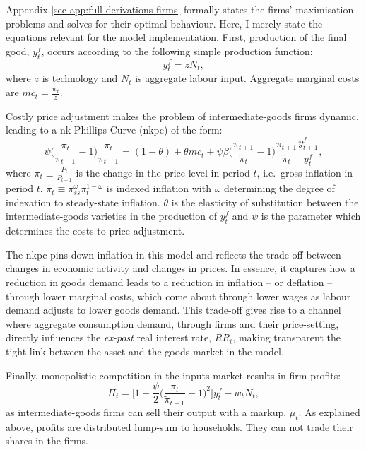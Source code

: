 \documentclass[a4paper,12pt]{article} %
\numberwithin{equation}{section} %
\numberwithin{figure}{section}
\numberwithin{table}{section}
\begin{document}
Appendix \ref{sec-app:full-derivations-firms} formally states the firms' maximisation problems and solves for their optimal behaviour. Here, I merely state the equations relevant for the model implementation. First, production of the final good, $y_t^f$, occurs according to the following simple production function:
\begin{equation}
    y_t^f = z N_t, \label{eq:firms-production}
\end{equation}
where $z$ is technology and $N_t$ is aggregate labour input. Aggregate marginal costs are $mc_t = \frac{w_t}{z}$. 

Costly price adjustment makes the problem of intermediate-goods firms dynamic, leading to a \Gls{nk} Phillips Curve (\Gls{nkpc}) of the form:
\begin{equation}
    \psi \Bigg( \frac{\pi_t}{\tilde{\pi}_{t-1}} - 1 \Bigg) \frac{\pi_t}{\tilde{\pi}_{t-1}} = (1-\theta) + \theta mc_t + \psi \beta \Bigg( \frac{\pi_{t+1}}{\tilde{\pi}_{t}} - 1 \Bigg) \frac{\pi_{t+1}}{\tilde{\pi}_{t}} \frac{y_{t+1}^f}{y_t^f}, \label{eq:firms-nkpc}
\end{equation}
where $\pi_t \equiv \frac{P_t}{P_{t-1}}$ is the change in the price level in period $t$, i.e.~gross inflation in period $t$. $\tilde{\pi}_t \equiv \pi_{ss}^{\omega} \pi_{t}^{1-\omega}$ is indexed inflation with $\omega$ determining the degree of indexation to steady-state inflation. $\theta$ is the elasticity of substitution between the intermediate-goods varieties in the production of $y_t^f$ and $\psi$ is the parameter which determines the costs to price adjustment.  

The \Gls{nkpc} pins down inflation in this model and reflects the trade-off between changes in economic activity and changes in prices. In essence, it captures how a reduction in goods demand leads to a reduction in inflation -- or deflation -- through lower marginal costs, which come about through lower wages as labour demand adjusts to lower goods demand. This trade-off gives rise to a channel where aggregate consumption demand, through firms and their price-setting, directly influences the \textit{ex-post} real interest rate, $RR_t$, making transparent the tight link between the asset and the goods market in the model.

Finally, monopolistic competition in the inputs-market results in firm profits:
\begin{equation}
    \Pi_t = \Bigg[ 1 - \frac{\psi}{2} \Bigg( \frac{\pi_t}{\tilde{\pi}_{t-1}} - 1 \Bigg)^2 \Bigg] y_t^f - w_t N_t, \label{eq:firms-profits}
\end{equation}
as intermediate-goods firms can sell their output with a markup, $\mu_t$. As explained above, profits are distributed lump-sum to households. They can not trade their shares in the firms.
\end{document}
